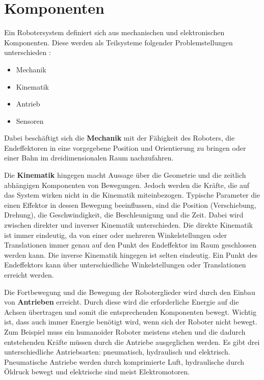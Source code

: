 \section{Komponenten}\label{Komponenten}
Ein Robotersystem definiert sich aus mechanischen und elektronischen Komponenten. Diese werden als Teilsysteme folgender Problemstellungen unterschieden \cite{Haun2007}:
\begin{itemize}
\item Mechanik
\item Kinematik
\item Antrieb
\item Sensoren
\end{itemize}
Dabei beschäftigt sich die \textbf{Mechanik} mit der Fähigkeit des Roboters, die Endeffektoren in eine vorgegebene Position und Orientierung zu bringen oder einer Bahn im dreidimensionalen Raum nachzufahren.

Die \textbf{Kinematik} hingegen macht Aussage über die Geometrie und die zeitlich abhängigen Komponenten von Bewegungen. Jedoch werden die Kräfte, die auf das System wirken nicht in die Kinematik miteinbezogen. Typische Parameter die einen Effektor in dessen Bewegung beeinflussen, sind die Position (Verschiebung, Drehung), die Geschwindigkeit, die Beschleunigung und die Zeit. Dabei wird zwischen direkter und inverser Kinematik unterschieden. Die direkte Kinematik ist immer eindeutig, da von einer oder mehreren Winkelstellungen oder Translationen immer genau auf den Punkt des Endeffektor im Raum geschlossen werden kann. Die inverse Kinematik hingegen ist selten eindeutig. Ein Punkt des Endeffektors kann über unterschiedliche Winkelstellungen oder Translationen erreicht werden. 

Die Fortbewegung und die Bewegung der Roboterglieder wird durch den Einbau von \textbf{Antrieben} erreicht. Durch diese wird die erforderliche Energie auf die Achsen übertragen und somit die entsprechenden Komponenten bewegt. Wichtig ist, dass auch immer Energie benötigt wird, wenn sich der Roboter nicht bewegt. Zum Beispiel muss ein humanoider Roboter meistens stehen und die dadurch entstehenden Kräfte müssen durch die Antriebe ausgeglichen werden. Es gibt drei unterschiedliche Antriebsarten: pneumatisch, hydraulisch und elektrisch. Pneumatische Antriebe werden durch komprimierte Luft, hydraulische durch Öldruck bewegt und elektrische sind meist Elektromotoren. 

